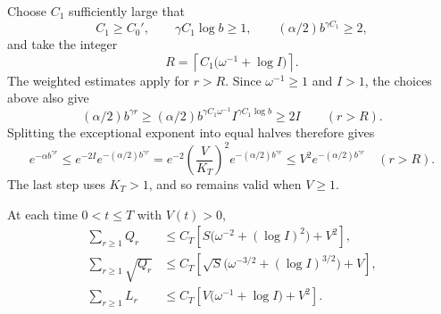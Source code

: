 Choose $C_1$ sufficiently large that
\[
 C_1\ge C_0',\qquad \gamma C_1\log b\ge1,
 \qquad (\alpha/2)b^{\gamma C_1}\ge2,
\]
and take the integer
\begin{equation}
 R=\left\lceil C_1\bigl(\omega^{-1}+\log I\bigr)\right\rceil.
 \label{eq:variance-cutoff}
\end{equation}
The weighted estimates apply for $r>R$.  Since $\omega^{-1}\ge1$
and $I>1$, the choices above also give
\[
 (\alpha/2)b^{\gamma r}
 \ge (\alpha/2)b^{\gamma C_1\omega^{-1}}
                  I^{\gamma C_1\log b}
 \ge 2I \qquad(r>R).
\]
Splitting the exceptional exponent into equal halves therefore gives
\begin{equation}
 e^{-\alpha b^{\gamma r}}
 \le e^{-2I}e^{-(\alpha/2)b^{\gamma r}}
 =e^{-2}\left(\frac{V}{K_T}\right)^2
       e^{-(\alpha/2)b^{\gamma r}}
 \le V^2 e^{-(\alpha/2)b^{\gamma r}}\quad(r>R).
 \label{eq:exception-absorption}
\end{equation}
The last step uses $K_T>1$, and so remains valid when $V\ge1$.

\begin{lemma}
\label{lem:cutoff-sums}
At each time $0<t\le T$ with $V(t)>0$,
\begin{equation}
 \begin{split}
 \sum_{r\ge1}Q_r
 &\le C_T\left[S\bigl(\omega^{-2}+(\log I)^2\bigr)+V^2\right],\\
 \sum_{r\ge1}\sqrt{Q_r}
 &\le C_T\left[\sqrt S\bigl(\omega^{-3/2}
                          +(\log I)^{3/2}\bigr)+V\right],\\
 \sum_{r\ge1}L_r
 &\le C_T\left[V\bigl(\omega^{-1}+\log I\bigr)+V^2\right].
 \end{split}
 \label{eq:cutoff-sums}
\end{equation}
\end{lemma}

